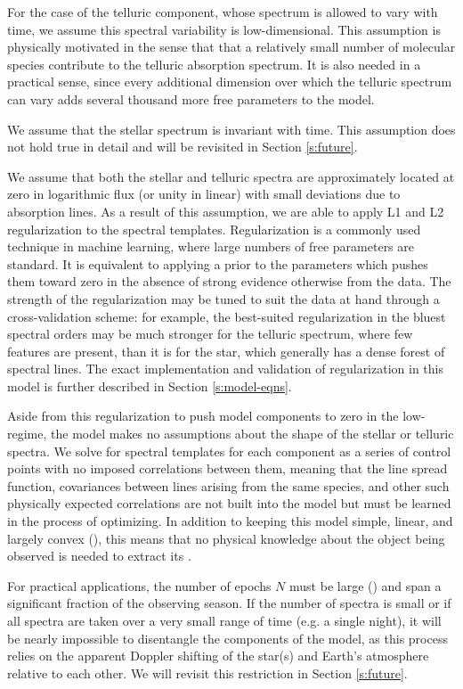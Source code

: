 \documentclass[modern]{aastex62}
\begin{document}
For the case of the telluric component, whose spectrum is allowed to vary with time, we assume this spectral variability is low-dimensional.
This assumption is physically motivated in the sense that that a relatively small number of molecular species contribute to the telluric absorption spectrum.
It is also needed in a practical sense, since every additional dimension over which the telluric spectrum can vary adds several thousand more free parameters to the model.

We assume that the stellar spectrum is invariant with time.
This assumption does not hold true in detail and will be revisited in Section \ref{s:future}.

We assume that both the stellar and telluric spectra are approximately located at zero in logarithmic flux (or unity in linear) with small deviations due to absorption lines.
As a result of this assumption, we are able to apply L1 and L2 regularization to the spectral templates.
Regularization is a commonly used technique in machine learning, where large numbers of free parameters are standard.
It is equivalent to applying a prior to the parameters which pushes them toward zero in the absence of strong evidence otherwise from the data.
The strength of the regularization may be tuned to suit the data at hand through a cross-validation scheme: for example, the best-suited regularization in the bluest spectral orders may be much stronger for the telluric spectrum, where few features are present, than it is for the star, which generally has a dense forest of spectral lines.
The exact implementation and validation of regularization in this model is further described in Section \ref{s:model-eqns}.

Aside from this regularization to push model components to zero in the low-\SNR regime, the model makes no assumptions about the shape of the stellar or telluric spectra.
We solve for spectral templates for each component as a series of control points with no imposed correlations between them, meaning that the line spread function, covariances between lines arising from the same species, and other such physically expected correlations are not built into the model but must be learned in the process of optimizing.
In addition to keeping this model simple, linear, and largely convex
(), this means that no physical knowledge about the object being observed is needed to extract its \RVs.

For practical applications, the number of epochs $N$ must be large () and span a significant fraction of the observing season.
If the number of spectra is small or if all spectra are taken over a very small range of time (e.g. a single night), it will be nearly impossible to disentangle the components of the model, as this process relies on the apparent Doppler shifting of the star(s) and Earth's atmosphere relative to each other.
We will revisit this restriction in Section \ref{s:future}.
\end{document}
